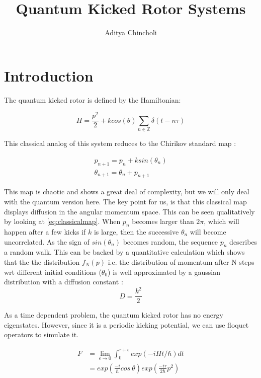 \documentclass[twocolumn]{report}
\title{Quantum Kicked Rotor Systems}
\author{Aditya Chincholi}
\begin{document}
\maketitle

\onecolumn
\begin{abstract}
\end{abstract}
\twocolumn
\chapter{Introduction}
The quantum kicked rotor is defined by the Hamiltonian:

\begin{equation}
H = \frac{p^2}{2} + k cos(\theta) \sum_{n \in \mathbb{Z}} \delta(t - n\tau)
\end{equation}

This classical analog of this system reduces to the Chirikov standard map
\cite{stockmann}:

\begin{align}
    p_{n+1} = p_n + k sin(\theta_n) \\
    \theta_{n+1} = \theta_n + p_{n+1} \label{eq:classicalmap}
\end{align}

This map is chaotic and shows a great deal of complexity, but we will only
deal with the quantum version here. The key point for us, is that this
classical map displays diffusion in the angular momentum space. This can be
seen qualitatively by looking at \ref{eq:classicalmap}. When $p_n$ becomes
larger than $2\pi$, which will happen after a few kicks if $k$ is large,
then the successive $\theta_n$ will become uncorrelated. As the sign of
$sin(\theta_n)$ becomes random, the sequence ${p_n}$ describes a random walk.
This can be backed by a quantitative calculation which shows that the
the distribution $f_N(p)$ i.e. the distribution of momentum after N steps
wrt different initial conditions ($\theta_0$) is well approximated by a
gaussian distribution with a diffusion constant \cite{stockmann}:
\begin{equation}
    D = \frac{k^2}{2}
\end{equation}

As a time dependent problem, the quantum kicked rotor has no energy eigenstates.
However, since it is a periodic kicking potential, we can use floquet operators
to simulate it.

\begin{align}
    F &= \lim_{\epsilon \to 0} \int_{0}^{\tau + \epsilon} exp(-iHt/\hbar) dt\\
    &= exp\left(\frac{-i}{\hbar} cos\ \theta\right)
    exp\left(\frac{-i\tau}{2\hbar}p^2\right)
\end{align}
\end{document}
